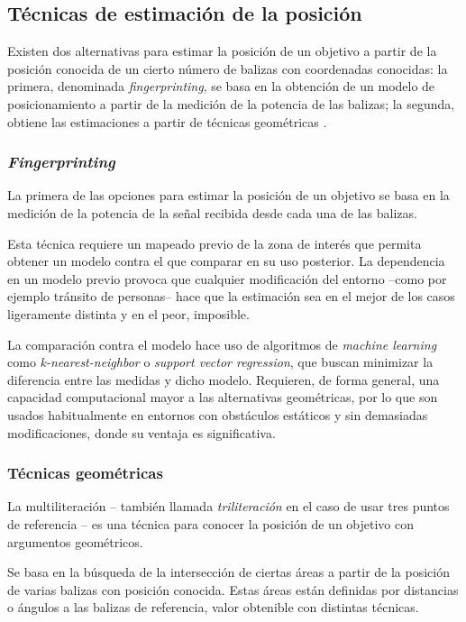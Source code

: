 \subsection{Técnicas de estimación de la posición}

Existen dos alternativas para estimar la posición de un objetivo a partir de la posición conocida de un cierto número de balizas con coordenadas conocidas: la primera, denominada \textit{fingerprinting}, se basa en la obtención de un modelo de posicionamiento a partir de la medición de la potencia de las balizas; la segunda, obtiene las estimaciones a partir de técnicas geométricas \cite{MAIN}.

\subsubsection{\textit{Fingerprinting}}

La primera de las opciones para estimar la posición de un objetivo se basa en la medición de la potencia de la señal recibida desde cada una de las balizas.

Esta técnica requiere un mapeado previo de la zona de interés que permita obtener un modelo contra el que comparar en su uso posterior.
La dependencia en un modelo previo provoca que cualquier modificación del entorno --como por ejemplo tránsito de personas-- hace que la estimación sea en el mejor de los casos ligeramente distinta y en el peor, imposible.

La comparación contra el modelo hace uso de algoritmos de \textit{machine learning} como \textit{k-nearest-neighbor} o \textit{support vector regression}, que buscan minimizar la diferencia entre las medidas y dicho modelo. 
Requieren, de forma general, una capacidad computacional mayor a las alternativas geométricas, por lo que son usados habitualmente en entornos con obstáculos estáticos y sin demasiadas modificaciones, donde su ventaja es significativa.

\subsubsection{Técnicas geométricas}

La multiliteración -- también llamada \textit{triliteración} en el caso de usar tres puntos de referencia -- es una técnica para conocer la posición de un objetivo con argumentos geométricos.

Se basa en la búsqueda de la intersección de ciertas áreas a partir de la posición de varias balizas con posición conocida.
Estas áreas están definidas por distancias o ángulos a las balizas de referencia, valor obtenible con distintas técnicas.

